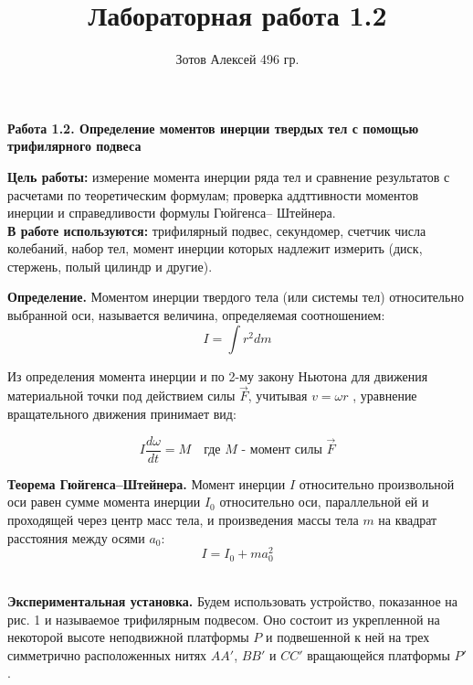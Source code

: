 \documentclass[12pt]{article}
\begin{document}
    \author {Зотов Алексей 496 гр.}
    \title {Лабораторная работа 1.2}
    \maketitle{}   
    {\large \textbf{Работа 1.2. Определение моментов инерции твердых тел с помощью трифилярного подвеса}}
    \newline \newline
    
    \indent
    \textbf{Цель работы:} измерение момента инерции ряда тел и сравнение результатов с расчетами по теоретическим формулам; проверка аддттивности моментов инерции и справедливости формулы Гюйгенса– Штейнера.
    \\\newline
    \indent
    \textbf{В работе используются:} трифилярный подвес, секундомер, счетчик числа колебаний, набор тел, момент инерции которых надлежит измерить (диск, стержень, полый цилиндр и другие).
    \\\newline
    
    \textbf{Определение.} Моментом инерции твердого тела (или системы тел) относительно выбранной оси, называется величина, определяемая соотношением: 
    \begin{equation}
              I = \int r^2dm
    \end{equation} 
    
    Из определения момента инерции и по 2-му закону Ньютона для движения материальной точки под действием силы $\vec{F}$, учитывая $v = \omega r$ , уравнение вращательного движения принимает вид:

    \begin{equation}
              I \frac{d\omega}{dt} = M \quad \text{где $M$ - момент силы $\vec{F}$}
    \end{equation} 

    \textbf{Теорема Гюйгенса–Штейнера.} Момент инерции $I$ относительно произвольной оси равен сумме момента инерции $I_0$ относительно оси, параллельной ей и проходящей через центр масс тела, и произведения массы тела $m$ на квадрат расстояния между осями $a_0$:
    \begin{equation}
        I = I_0 + ma^2_0
    \end{equation} \\\newline

    \textbf{Экспериментальная установка.} Будем использовать устройство, показанное на рис. 1 и называемое трифилярным подвесом. Оно состоит из укрепленной на некоторой высоте неподвижной платформы $P$ и подвешенной к ней на трех симметрично расположенных нитях $AA'$, $BB'$ и $CC'$ вращающейся платформы $P'$.
\end{document}
